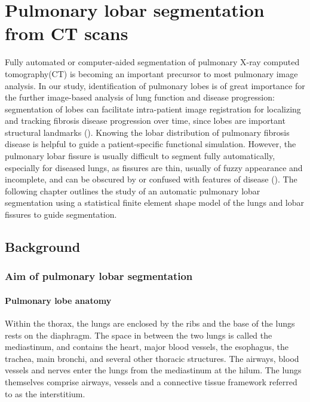  \chapter{Pulmonary lobar segmentation from CT scans} \label{Yuwen_Segmentation}
Fully automated or computer-aided segmentation of pulmonary X-ray computed tomography(CT) is becoming an important precursor to most pulmonary image analysis. In our study, identification of pulmonary lobes is of great importance for the further image-based analysis of lung function and disease progression: segmentation of lobes can facilitate intra-patient image registration for localizing and tracking fibrosis disease progression over time, since lobes are important structural landmarks (\citep{lassen2011interactive}). Knowing the lobar distribution of pulmonary fibrosis disease is helpful to guide a patient-specific functional simulation.  However, the pulmonary lobar fissure is usually difficult to segment fully automatically, especially for diseased lungs, as fissures are thin, usually of fuzzy appearance and incomplete, and can be obscured by or confused with features of disease (\citep{ukil2009anatomy}). The following chapter outlines the study of an automatic pulmonary lobar segmentation using a statistical finite element shape model of the lungs and lobar fissures to guide segmentation. 

\section{Background} \label{SegmentationBackground}
\subsection{Aim of pulmonary lobar segmentation} \label{SegmentationAim}
\subsubsection{Pulmonary lobe anatomy}
Within the thorax, the lungs are enclosed by the ribs and the base of the lungs rests on the diaphragm. The space in between the two lungs is called the mediastinum, and contains the heart, major blood vessels, the esophagus, the trachea, main bronchi, and several other thoracic structures. The airways, blood vessels and nerves enter the lungs from the mediastinum at the hilum. The lungs themselves comprise airways, vessels and a connective tissue framework referred to as the interstitium.

